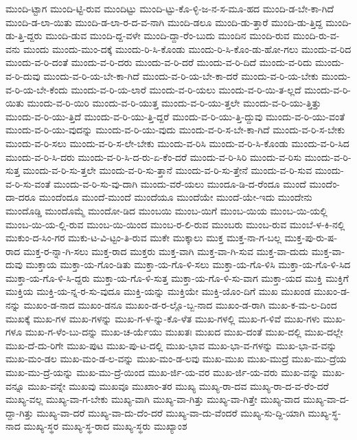 {ಮುಂದಿ-ಟ್ಟಾಗ
ಮುಂದಿ-ಟ್ಟಿ-ರುವ
ಮುಂದಿಟ್ಟು
ಮುಂದಿ-ಟ್ಟು-ಕೊ-ಳ್ಳಿ-ಜ-ನ-ಸ-ಮೂ-ಹದ
ಮುಂದಿ-ಡ-ಬೇ-ಕಾ-ಗಿದೆ
ಮುಂದಿ-ಡ-ಲಾ-ಯಿತು
ಮುಂದಿ-ಡ-ಲಾ-ರ-ದ-ವ-ನಾಗಿ
ಮುಂದಿ-ಡಲೂ
ಮುಂದಿ-ಡು-ತ್ತಾರೆ
ಮುಂದಿ-ಡು-ತ್ತಿದ್ದ
ಮುಂದಿ-ಡು-ತ್ತಿ-ದ್ದರು
ಮುಂದಿ-ಡುವ
ಮುಂದಿ-ದ್ದ-ವಳೇ
ಮುಂದಿ-ದ್ದಾ-ರೆಂ-ಬುದು
ಮುಂದಿನ
ಮುಂದಿ-ರುವ
ಮುಂದಿ-ರು-ವ-ವನು
ಮುಂದು
ಮುಂದು-ಮುಂ-ದಕ್ಕೆ
ಮುಂದು-ರಿ-ಸಿ-ಕೊಂಡು
ಮುಂದು-ರಿ-ಸಿ-ಕೊಂ-ಡು-ಹೋ-ಗಲು
ಮುಂದು-ವ-ರಿದ
ಮುಂದು-ವ-ರಿ-ದಂತೆ
ಮುಂದು-ವ-ರಿ-ದರು
ಮುಂದು-ವ-ರಿ-ದರೆ
ಮುಂದು-ವ-ರಿ-ದಿದೆ
ಮುಂದು-ವ-ರಿದು
ಮುಂದು-ವ-ರಿ-ದುವು
ಮುಂದು-ವ-ರಿ-ಯ-ಬೇ-ಕಾ-ಗಿದೆ
ಮುಂದು-ವ-ರಿ-ಯ-ಬೇ-ಕಾ-ದರೆ
ಮುಂದು-ವ-ರಿ-ಯ-ಬೇಕು
ಮುಂದು-ವ-ರಿ-ಯ-ಬೇ-ಕೆಂದು
ಮುಂದು-ವ-ರಿ-ಯ-ಲಾರೆ
ಮುಂದು-ವ-ರಿ-ಯಲು
ಮುಂದು-ವ-ರಿ-ಯಿ-ತ-ಲ್ಲದೆ
ಮುಂದು-ವ-ರಿ-ಯಿತು
ಮುಂದು-ವ-ರಿ-ಯಿರಿ
ಮುಂದು-ವ-ರಿ-ಯುತ್ತ
ಮುಂದು-ವ-ರಿ-ಯು-ತ್ತಲೇ
ಮುಂದು-ವ-ರಿ-ಯು-ತ್ತಿತ್ತು
ಮುಂದು-ವ-ರಿ-ಯು-ತ್ತಿದೆ
ಮುಂದು-ವ-ರಿ-ಯು-ತ್ತಿ-ದ್ದರೆ
ಮುಂದು-ವ-ರಿ-ಯು-ತ್ತಿ-ದ್ದುವು
ಮುಂದು-ವ-ರಿ-ಯು-ವಂತೆ
ಮುಂದು-ವ-ರಿ-ಯು-ವುದನ್ನು
ಮುಂದು-ವ-ರಿ-ಯು-ವುದು
ಮುಂದು-ವ-ರಿ-ಸ-ಬೇ-ಕಾ-ಗಿದೆ
ಮುಂದು-ವ-ರಿ-ಸ-ಬೇಕು
ಮುಂದು-ವ-ರಿ-ಸಲು
ಮುಂದು-ವ-ರಿ-ಸ-ಲೇ-ಬೇಕು
ಮುಂದು-ವ-ರಿಸಿ
ಮುಂದು-ವ-ರಿ-ಸಿ-ಕೊಂಡು
ಮುಂದು-ವ-ರಿ-ಸಿದ
ಮುಂದು-ವ-ರಿ-ಸಿ-ದರು
ಮುಂದು-ವ-ರಿ-ಸಿ-ದ-ರು-ಏ-ಕೆಂ-ದರೆ
ಮುಂದು-ವ-ರಿ-ಸಿರಿ
ಮುಂದು-ವ-ರಿಸು
ಮುಂದು-ವ-ರಿ-ಸುತ್ತ
ಮುಂದು-ವ-ರಿ-ಸು-ತ್ತಲೇ
ಮುಂದು-ವ-ರಿ-ಸು-ತ್ತಾನೆ
ಮುಂದು-ವ-ರಿ-ಸು-ತ್ತೇನೆ
ಮುಂದು-ವ-ರಿ-ಸುವ
ಮುಂದು-ವ-ರಿ-ಸು-ವಂತೆ
ಮುಂದು-ವ-ರಿ-ಸು-ವು-ದಾಗಿ
ಮುಂದು-ವರೆ-ಯಲು
ಮುಂದೂ-ಡಿ-ದ-ರೆಂದೂ
ಮುಂದೆ
ಮುಂದೆಂ-ದಾ-ದರೂ
ಮುಂದೆಂದೂ
ಮುಂದೆ-ಮುಂದೆ
ಮುಂದೆಯೂ
ಮುಂದೆಯೇ
ಮುಂದೆ-ಯೇ-ಇದು
ಮುಂದೇನು
ಮುಂದೊಡ್ಡಿ
ಮುಂದೊಮ್ಮೆ
ಮುಂದೋ-ಡಿದ
ಮುಂಬಯಿ
ಮುಂಬ-ಯಿಗೆ
ಮುಂಬ-ಯಿಯ
ಮುಂಬ-ಯಿ-ಯಲ್ಲಿ
ಮುಂಬ-ಯಿ-ಯ-ಲ್ಲಿ-ರುವ
ಮುಂಬ-ಯಿ-ಯಿಂದ
ಮುಂಬ-ರ-ಲಿ-ರುವ
ಮುಂಬರು
ಮುಂಬ-ರುವ
ಮುಂಬೆ-ಳ-ಕಿ-ನಲ್ಲಿ
ಮುಕುಂ-ದ-ಸಿಂ-ಗರ
ಮುಕು-ಟ-ವಿ-ಟ್ಟಂ-ತಿ-ರುವ
ಮುಕೇ
ಮುಕ್ಕಾಲು
ಮುಕ್ತ
ಮುಕ್ತ-ನಾ-ಗ-ಬಲ್ಲ
ಮುಕ್ತ-ಪು-ರು-ಷ-ರಾದ
ಮುಕ್ತ-ರ-ನ್ನಾ-ಗಿ-ಸಲು
ಮುಕ್ತ-ರಾದ
ಮುಕ್ತರು
ಮುಕ್ತ-ವಾಗಿ
ಮುಕ್ತ-ವಾ-ಗಿ-ಸುವ
ಮುಕ್ತ-ವಾ-ದುದು
ಮುಕ್ತ-ವಾ-ದುವು
ಮುಕ್ತಾಯ
ಮುಕ್ತಾ-ಯ-ಗೊಂ-ಡಿತು
ಮುಕ್ತಾ-ಯ-ಗೊ-ಳಿ-ಸಲು
ಮುಕ್ತಾ-ಯ-ಗೊ-ಳಿಸಿ
ಮುಕ್ತಾ-ಯ-ಗೊ-ಳಿ-ಸಿದ
ಮುಕ್ತಾ-ಯ-ಗೊ-ಳಿ-ಸಿ-ದ್ದರು
ಮುಕ್ತಾ-ಯ-ಗೊ-ಳಿ-ಸುತ್ತ
ಮುಕ್ತಾ-ಯ-ಗೊ-ಳಿ-ಸು-ವಾಗ
ಮುಕ್ತಾ-ಯದ
ಮುಕ್ತಿ
ಮುಕ್ತಿಗೆ
ಮುಕ್ತಿಯ
ಮುಕ್ತಿ-ಯ-ನ್ನ-ರ-ಸು-ವುದೂ
ಮುಕ್ತಿ-ಯನ್ನು
ಮುಕ್ತಿಯೇ
ಮುಕ್ತಿ-ಯೊಂ-ದಿಗೆ
ಮುಖ
ಮುಖಂಡ
ಮುಖಂ-ಡ-ನನ್ನು
ಮುಖಂ-ಡ-ನಾದ
ಮುಖಂ-ಡನೂ
ಮುಖಂ-ಡ-ರ-ಲ್ಲೊ-ಬ್ಬ-ನಾದ
ಮುಖಂ-ಡ-ರಾಗಿ
ಮುಖ-ಕ-ಮ-ಲ-ದಿಂದ
ಮುಖಕ್ಕೆ
ಮುಖ-ಗಳ
ಮುಖ-ಗಳನ್ನು
ಮುಖ-ಗ-ಳ-ನ್ನು-ಕೊ-ಳೆತ
ಮುಖ-ಗಳಲ್ಲಿ
ಮುಖ-ಗ-ಳಿವೆ
ಮುಖ-ಗಳು
ಮುಖ-ಗಳೂ
ಮುಖ-ಗ-ಳೆಂ-ಬು-ದನ್ನು
ಮುಖ-ಚ-ರ್ಯೆಯು
ಮುಖತಃ
ಮುಖದ
ಮುಖ-ದಂತೆ
ಮುಖ-ದಲ್ಲಿ
ಮುಖ-ದಲ್ಲೇ
ಮುಖ-ದೆ-ದು-ರಿಗೇ
ಮುಖ-ಪುಟ
ಮುಖ-ಪು-ಟ-ದಲ್ಲಿ
ಮುಖ-ಭಾವ
ಮುಖ-ಭಾ-ವ-ಗಳನ್ನು
ಮುಖ-ಭಾ-ವ-ವನ್ನು
ಮುಖ-ಮಂ-ಡಲ
ಮುಖ-ಮಂ-ಡ-ಲ-ವನ್ನು
ಮುಖ-ಮಂ-ಡ-ಲವು
ಮುಖ-ಮುಖ
ಮುಖ-ಮುದ್ರೆ
ಮುಖ-ಮು-ದ್ರೆಯ
ಮುಖ-ಮು-ದ್ರೆ-ಯನ್ನು
ಮುಖ-ಮು-ದ್ರೆ-ಯಿಂದ
ಮುಖ-ರ್ಜಿ-ಯ-ವರ
ಮುಖ-ರ್ಜಿ-ಯ-ವರು
ಮುಖ-ವನ್ನು
ಮುಖ-ವನ್ನೂ
ಮುಖ-ವನ್ನೇ
ಮುಖವು
ಮುಖವೂ
ಮುಖಾಂ-ತರ
ಮುಖ್ಯ
ಮುಖ್ಯ-ರಾ-ದವ
ಮುಖ್ಯ-ರಾ-ದ-ವ-ರೆಂ-ದರೆ
ಮುಖ್ಯ-ವಲ್ಲ
ಮುಖ್ಯ-ವಾ-ಗ-ಬೇಕು
ಮುಖ್ಯ-ವಾಗಿ
ಮುಖ್ಯ-ವಾ-ಗಿತ್ತು
ಮುಖ್ಯ-ವಾ-ಗಿತ್ತೇ
ಮುಖ್ಯ-ವಾದ
ಮುಖ್ಯ-ವಾ-ದ-ದ್ದಾ-ಗಿತ್ತು
ಮುಖ್ಯ-ವಾ-ದರೆ
ಮುಖ್ಯ-ವಾ-ದು-ದೆಂ-ದರೆ
ಮುಖ್ಯ-ವಾ-ದು-ವೆಂದರೆ
ಮುಖ್ಯ-ಸು-ದ್ದಿ-ಯಾಗಿ
ಮುಖ್ಯ-ಸ್ಥ-ನಾದ
ಮುಖ್ಯ-ಸ್ಥರ
ಮುಖ್ಯ-ಸ್ಥ-ರಾದ
ಮುಖ್ಯ-ಸ್ಥರು
ಮುಖ್ಯಾಂಶ
}
